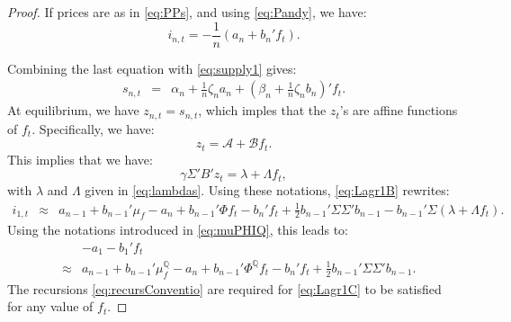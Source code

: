 \documentclass[
  12pt,
]{book}
\theoremstyle{definition}
\theoremstyle{definition}
\theoremstyle{definition}
\theoremstyle{definition}
\theoremstyle{remark}
\begin{document}
\begin{proof}
If prices are as in \eqref{eq:PPs}, and using \eqref{eq:Pandy}, we have:
\[
i_{n,t} = -\frac{1}{n}(a_n + b_n'f_t).
\]

Combining the last equation with \eqref{eq:supply1} gives:
\begin{eqnarray}
s_{n,t} &=& \alpha_n  + \frac{1}{n}\zeta_n a_n + \left(\beta_n + \frac{1}{n}\zeta_n b_n\right)'f_t.
\end{eqnarray}
At equilibrium, we have \(z_{n,t}=s_{n,t}\), which imples that the \(z_t\)'s are affine functions of \(f_t\). Specifically, we have:
\[
z_t = \mathcal{A} + \mathcal{B}f_t.
\]
This implies that we have:
\[
\gamma \Sigma' B'z_t  = \lambda + \Lambda f_t,
\]
with \(\lambda\) and \(\Lambda\) given in \eqref{eq:lambdas}. Using these notations, \eqref{eq:Lagr1B} rewrites:
\begin{eqnarray*}
i_{1,t} &\approx& a_{n-1} + b_{n-1}'\mu_f  - a_{n} + b_{n-1}'\Phi f_t - b_{n}'f_{t} + \frac{1}{2}b_{n-1}'\Sigma \Sigma'b_{n-1} - b_{n-1}'\Sigma (\lambda + \Lambda f_t).
\end{eqnarray*}
Using the notations introduced in \eqref{eq:muPHIQ}, this leads to:
\begin{eqnarray}
&&- a_1 - b_1' f_t \nonumber\\
&\approx& a_{n-1} + b_{n-1}'\mu_f^{\mathbb{Q}}  - a_{n} + b_{n-1}'\Phi^{\mathbb{Q}} f_t - b_{n}'f_{t} + \frac{1}{2}b_{n-1}'\Sigma \Sigma'b_{n-1}. \label{eq:Lagr1C}
\end{eqnarray}
The recursions \eqref{eq:recursConventio} are required for \eqref{eq:Lagr1C} to be satisfied for any value of \(f_t\).
\end{proof}
\end{document}
